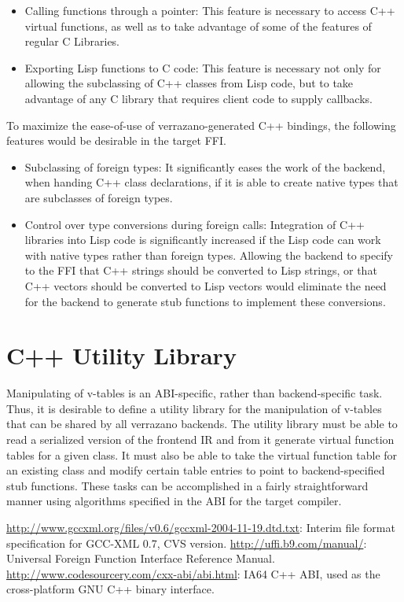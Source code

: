 \documentclass[12pt]{article}
\begin{document}
\begin{itemize}
\item Calling functions through a pointer: This feature is necessary to access C++ virtual functions, as well as to take advantage of some of the features of regular C Libraries.
\item Exporting Lisp functions to C code: This feature is necessary not only for allowing the subclassing of C++ classes from Lisp code, but to take advantage of any C library that requires client code to supply callbacks.
\end{itemize}

To maximize the ease-of-use of verrazano-generated C++ bindings, the following features would be desirable in the target FFI.

\begin{itemize}
\item Subclassing of foreign types: It significantly eases the work of the backend, when handing C++ class declarations, if it is able to create native types that are subclasses of foreign types.
\item Control over type conversions during foreign calls: Integration of C++ libraries into Lisp code is significantly increased if the Lisp code can work with native types rather than foreign types. Allowing the backend to specify to the FFI that C++ strings should be converted to Lisp strings, or that C++ vectors should be converted to Lisp vectors would eliminate the need for the backend to generate stub functions to implement these conversions.
\end{itemize}

\section{C++ Utility Library}
Manipulating of v-tables is an ABI-specific, rather than backend-specific task. Thus, it is desirable to define a utility library for the manipulation of v-tables that can be shared by all verrazano backends. The utility library must be able to read a serialized version of the frontend IR and from it generate virtual function tables for a given class. It must also be able to take the virtual function table for an existing class and modify certain table entries to point to backend-specified stub functions. These tasks can be accomplished in a fairly straightforward manner using algorithms specified in the ABI for the target compiler.

\begin{thebibliography}{1}
\url{http://www.gccxml.org/files/v0.6/gccxml-2004-11-19.dtd.txt}: Interim file format specification for GCC-XML 0.7, CVS version.
\url{http://uffi.b9.com/manual/}: Universal Foreign Function Interface Reference Manual.
\url{http://www.codesourcery.com/cxx-abi/abi.html}: IA64 C++ ABI, used as the cross-platform GNU C++ binary interface.
\end{thebibliography}
\end{document}
